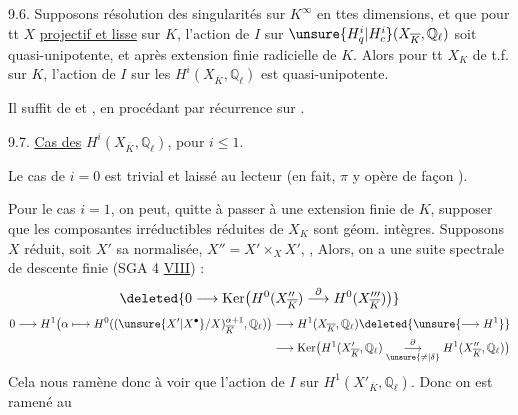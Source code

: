   9.6. Supposons résolution des singularités sur $K^{\infty}$ en ttes dimensions, et que pour tt $X$  \uline{projectif et lisse} sur $K$,  l'action de $I$ sur $\unsure{H^i_q|H^i_c}(X_{\overline K},\mathbb{Q}_\ell)$ soit quasi-unipotente, et  après extension finie radicielle de $K$. Alors  pour tt $X_K$ de t.f. sur $K$, l'action de $I$ sur les $H^i(X_{\overline K},\mathbb{Q}_\ell)$ est quasi-unipotente.

Il suffit de    et , en procédant par récurrence sur .


9.7. \uline{Cas des} $H^i(X_{\overline K},\mathbb{Q}_\ell)$, pour $i\leq 1$.

Le cas de $i=0$ est trivial et laissé au lecteur (en fait, $\pi$ y opère de façon ).

Pour le cas $i=1$, on  peut, quitte à passer à une extension finie de $K$, supposer que les composantes irréductibles réduites de $X_K$ sont géom. intègres. Supposons $X$ réduit, soit $X'$ sa normalisée, $X''=X'\times_X X'$, ,  Alors, on  a une suite spectrale de descente finie (SGA 4 \uline{VIII}) :
\[
\deleted{0\longrightarrow\operatorname{Ker}\bigl(H^0(X''_{\overline K})\overset{\partial}{\longrightarrow}H^0(X'''_{\overline K})\bigr)}
\]
\[
\begin{aligned}
0\longrightarrow H^1\bigl(\alpha\longmapsto H^0((\unsure{X'|X^\bullet}/X)^{\alpha+1}_{\overline K},\mathbb{Q}_\ell)\bigr)&\longrightarrow H^1(X_{\overline K},\mathbb{Q}_\ell)\deleted{\unsure{\longrightarrow H^1}}\\
&\longrightarrow\operatorname{Ker}\bigl(H^1(X'_{\overline K},\mathbb{Q}_\ell)\overset{\partial}{\underset{\unsure{\neq|\delta}}{\longrightarrow}}H^1(X''_{\overline K},\mathbb{Q}_\ell)\bigr)
\end{aligned}
\]
Cela nous ramène donc à voir que l'action de $I$ sur  $H^1(X'_{\overline K},\mathbb{Q}_\ell)$. Donc on est ramené au
